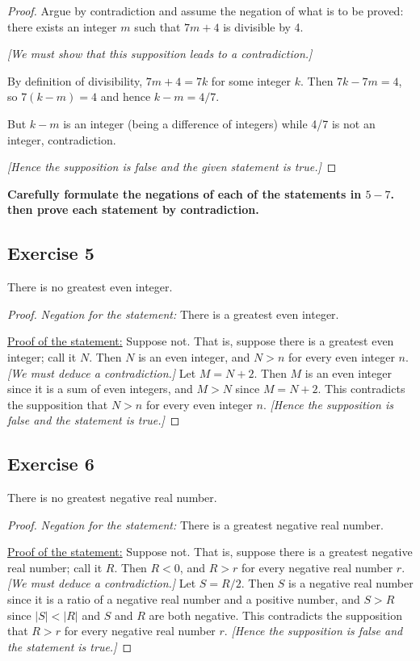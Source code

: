\documentclass[14pt]{extarticle}
\newcommand{\cy}{\color{cyan}}
\begin{document}
\begin{proof}
Argue by contradiction and assume the negation of what is to be proved: there exists an integer $m$ such that $7m+4$ is divisible by 4.

{\it [We must show that this supposition leads to a contradiction.]}

By definition of divisibility, $7m+4 = 7k$ for some integer $k$. Then $7k-7m = 4$, so $7(k-m) = 4$ and hence $k-m = 4/7$.

But $k-m$ is an integer (being a difference of integers) while 4/7 is not an integer, contradiction.

{\it [Hence the supposition is false and the given statement is true.]}
\end{proof}

{\bf \cy Carefully formulate the negations of each of the statements in $5-7$. then prove each statement by contradiction.}

\subsection{Exercise 5}
There is no greatest even integer.

\begin{proof}
{\it Negation for the statement:} There is a greatest even
integer.

\underline{Proof of the statement:} Suppose not. That is, suppose there is a greatest even integer; call it $N$. Then $N$ is an even integer, and $N > n$ for every even integer $n$. {\it [We must deduce a contradiction.]} Let $M = N + 2$. Then $M$ is an even integer since it is a sum of even integers, and $M > N$ since $M = N + 2$. This contradicts the supposition that $N > n$ for every even integer $n$. {\it [Hence the supposition is false and the statement is true.]}
\end{proof}

\subsection{Exercise 6}
There is no greatest negative real number.

\begin{proof}
{\it Negation for the statement:} There is a greatest negative real number.

\underline{Proof of the statement:} Suppose not. That is, suppose there is a greatest negative real number; call it $R$. Then $R < 0$, and $R > r$ for every negative real number $r$. {\it [We must deduce a contradiction.]} Let $S = R / 2$. Then $S$ is a negative real number since it is a ratio of a negative real number and a positive number, and $S > R$ since $|S| < |R|$ and $S$ and $R$ are both negative. This contradicts the supposition that $R > r$ for every negative real number $r$. {\it [Hence the supposition is false and the statement is true.]}
\end{proof}
\end{document}

